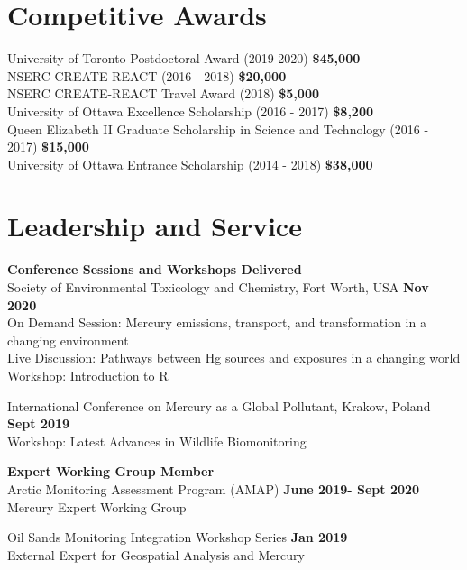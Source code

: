 \documentclass[margin,line]{res}
\begin{document}
\begin{resume}
\section{\sc Competitive Awards}

University of Toronto Postdoctoral Award
(2019-2020)
\hfill {\textbf{\$45,000}}\\
NSERC CREATE-REACT (2016 - 2018)
\hfill {\textbf{\$20,000}}\\
NSERC CREATE-REACT Travel Award (2018)
\hfill {\textbf{\$5,000}}\\
University of Ottawa Excellence Scholarship (2016 - 2017)
\hfill {\textbf{\$8,200}}\\
Queen Elizabeth II Graduate Scholarship in Science and Technology (2016 - 2017)
\hfill {\textbf{\$15,000}}\\
University of Ottawa Entrance Scholarship (2014 - 2018)
\hfill {\textbf{\$38,000}}\\

\vspace*{.1in}

\section{\sc Leadership and Service}
{\bf Conference Sessions and Workshops Delivered}\\
Society of Environmental Toxicology and Chemistry, Fort Worth, USA \hfill {\bf  Nov 2020}\\
On Demand Session: Mercury emissions, transport, and transformation in a changing environment\\
Live Discussion: Pathways between Hg sources and exposures in a changing world\\
Workshop: Introduction to R

International Conference on Mercury as a Global Pollutant, Krakow, Poland \hfill {\bf Sept 2019}\\
Workshop: Latest Advances in Wildlife Biomonitoring

{\bf Expert Working Group Member}\\
Arctic Monitoring Assessment Program (AMAP)
\hfill {\bf  June 2019- Sept 2020}\\
Mercury Expert Working Group

Oil Sands Monitoring Integration Workshop Series
\hfill {\bf  Jan 2019}\\
External Expert for Geospatial Analysis and Mercury

\vspace*{.1in}


\end{resume}
\end{document}
